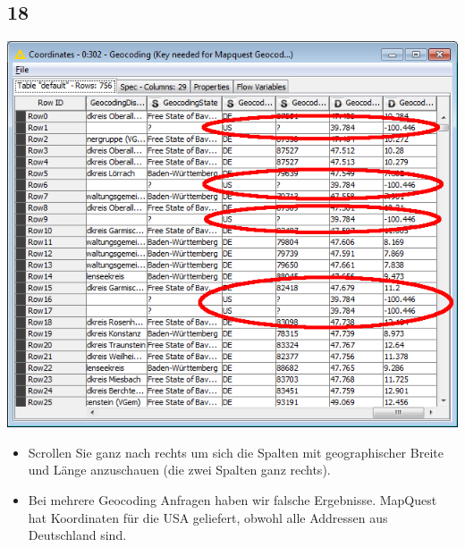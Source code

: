 \documentclass{beamer}
\begin{document}
\subsection{18}
\begin{frame}
	\begin{center}
  		\includegraphics[height=0.6\textheight]{18.png}
	\end{center}
	\begin{itemize}
		\item Scrollen Sie ganz nach rechts um sich die Spalten mit geographischer Breite und Länge anzuschauen (die zwei Spalten ganz rechts).
		\item Bei mehrere Geocoding Anfragen haben wir falsche Ergebnisse. MapQuest hat Koordinaten für die USA geliefert, obwohl alle Addressen aus Deutschland sind.
	\end{itemize}
\end{frame}
\end{document}
